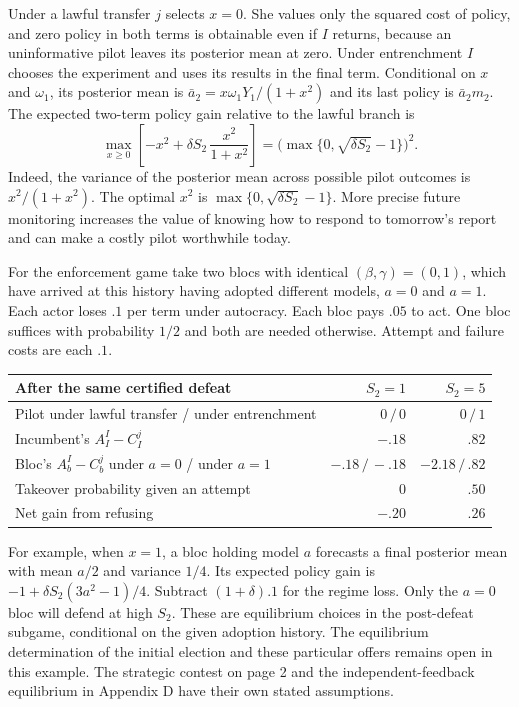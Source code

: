 \documentclass[11pt,letterpaper]{article}
\begin{document}
Under a lawful transfer $j$ selects $x=0$. She values only the squared cost of policy, and zero policy in both terms is obtainable even if $I$ returns, because an uninformative pilot leaves its posterior mean at zero. Under entrenchment $I$ chooses the experiment and uses its results in the final term. Conditional on $x$ and $\omega_1$, its posterior mean is $\bar a_2=x\omega_1Y_1/(1+x^2)$ and its last policy is $\bar a_2m_2$. The expected two-term policy gain relative to the lawful branch is
\[
 \max_{x\ge0}\left[-x^2+\delta S_2\,\frac{x^2}{1+x^2}\right]
   =\big(\max\{0,\sqrt{\delta S_2}-1\}\big)^2.
\]
Indeed, the variance of the posterior mean across possible pilot outcomes is $x^2/(1+x^2)$. The optimal $x^2$ is $\max\{0,\sqrt{\delta S_2}-1\}$. More precise future monitoring increases the value of knowing how to respond to tomorrow's report and can make a costly pilot worthwhile today.

For the enforcement game take two blocs with identical $(\beta,\gamma)=(0,1)$, which have arrived at this history having adopted different models, $a=0$ and $a=1$. Each actor loses $.1$ per term under autocracy. Each bloc pays $.05$ to act. One bloc suffices with probability $1/2$ and both are needed otherwise. Attempt and failure costs are each $.1$.
\begin{center}\small
\begin{tabular}{@{}lrr@{}}\toprule
After the same certified defeat & $S_2=1$ & $S_2=5$\\\midrule
Pilot under lawful transfer / under entrenchment & $0\,/\,0$ & $0\,/\,1$\\
Incumbent's $A_I^I-C_I^j$ & $-.18$ & $.82$\\
Bloc's $A_b^I-C_b^j$ under $a=0$ / under $a=1$ & $-.18\,/\,-.18$ & $-2.18\,/\,.82$\\
Takeover probability given an attempt & $0$ & $.50$\\
Net gain from refusing & $-.20$ & $.26$\\\bottomrule
\end{tabular}
\end{center}
For example, when $x=1$, a bloc holding model $a$ forecasts a final posterior mean with mean $a/2$ and variance $1/4$. Its expected policy gain is $-1+\delta S_2(3a^2-1)/4$. Subtract $(1+\delta).1$ for the regime loss. Only the $a=0$ bloc will defend at high $S_2$. These are equilibrium choices in the post-defeat subgame, conditional on the given adoption history. The equilibrium determination of the initial election and these particular offers remains open in this example. The strategic contest on page 2 and the independent-feedback equilibrium in Appendix D have their own stated assumptions.
\end{document}

